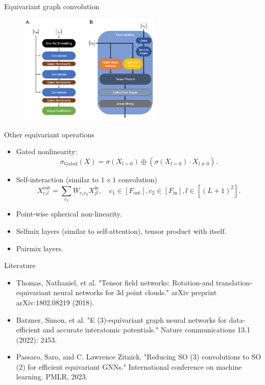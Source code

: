 \begin{frame}{Equivariant graph convolution}
    \begin{figure}
        \includegraphics[width=0.6\textwidth]{figures/e3nn_1.jpg}
    \end{figure}
\end{frame}


\begin{frame}{Other equivariant operations}
    \begin{itemize}
        \item Gated nonlinearity:
        \begin{equation*}
            \sigma_{\text{Gated}}(X) = \sigma(X_{l=0}) \oplus (\sigma(X_{l=0})
            \cdot X_{l \neq 0}).
        \end{equation*}
        \item Self-interaction (similar to $1\times 1$ convolution)
        \begin{equation*}
            X_{c_1l}^{\text{out}} = \sum_{c_2} W_{c_1c_2}X_{jl}^{\text{in}}, \quad c_1 \in [F_{\text{out}}],
            c_2 \in [F_{\text{in}}], l \in [(L + 1)^2].
        \end{equation*}
        \item Point-wise spherical non-linearity.
        \item Selfmix layers (similar to self-attention), tensor product with itself.
        \item Pairmix layers.
    \end{itemize}
\end{frame}


\begin{frame}{Literature}
    \begin{itemize}
        \item Thomas, Nathaniel, et al. "Tensor field networks: Rotation-and
        translation-equivariant neural networks for 3d point clouds." arXiv
        preprint arXiv:1802.08219 (2018).
        \item Batzner, Simon, et al. "E (3)-equivariant graph neural networks
        for data-efficient and accurate interatomic potentials." Nature
        communications 13.1 (2022): 2453.
        \item Passaro, Saro, and C. Lawrence Zitnick. "Reducing SO (3) convolutions
        to SO (2) for efficient equivariant GNNs." International conference on
        machine learning. PMLR, 2023.
    \end{itemize}
\end{frame}


